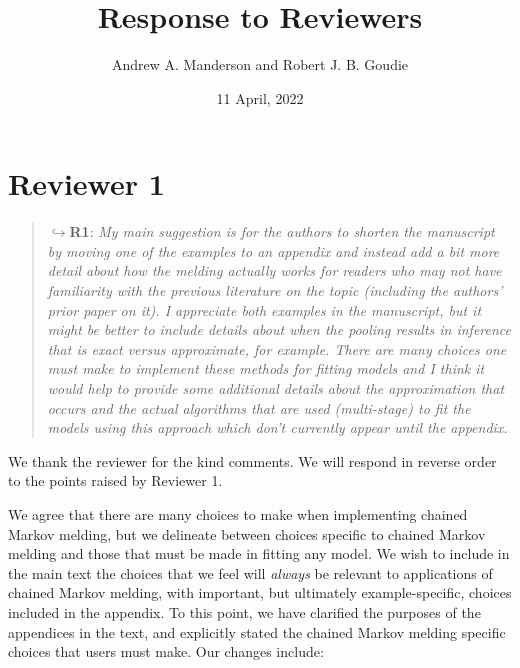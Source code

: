 \documentclass[
  10pt,
  a4paper,
]{article}
\title{Response to Reviewers}
\author{Andrew A. Manderson and Robert J. B. Goudie}
\date{11 April, 2022}
\begin{document}
\maketitle

\hypertarget{reviewer-1}{%
\section*{Reviewer 1}\label{reviewer-1}}

\begin{quote}
\(\hookrightarrow\)\textbf{R1}: \emph{My main suggestion is for the
authors to shorten the manuscript by moving one of the examples to an
appendix and instead add a bit more detail about how the melding
actually works for readers who may not have familiarity with the
previous literature on the topic (including the authors' prior paper on
it). I appreciate both examples in the manuscript, but it might be
better to include details about when the pooling results in inference
that is exact versus approximate, for example. There are many choices
one must make to implement these methods for fitting models and I think
it would help to provide some additional details about the approximation
that occurs and the actual algorithms that are used (multi-stage) to fit
the models using this approach which don't currently appear until the
appendix.}
\end{quote}

We thank the reviewer for the kind comments. We will respond in reverse
order to the points raised by Reviewer 1.

We agree that there are many choices to make when implementing chained
Markov melding, but we delineate between choices specific to chained
Markov melding and those that must be made in fitting any model. We wish
to include in the main text the choices that we feel will \emph{always}
be relevant to applications of chained Markov melding, with important,
but ultimately example-specific, choices included in the appendix. To
this point, we have clarified the purposes of the appendices in the
text, and explicitly stated the chained Markov melding specific choices
that users must make. Our changes include:
\end{document}

